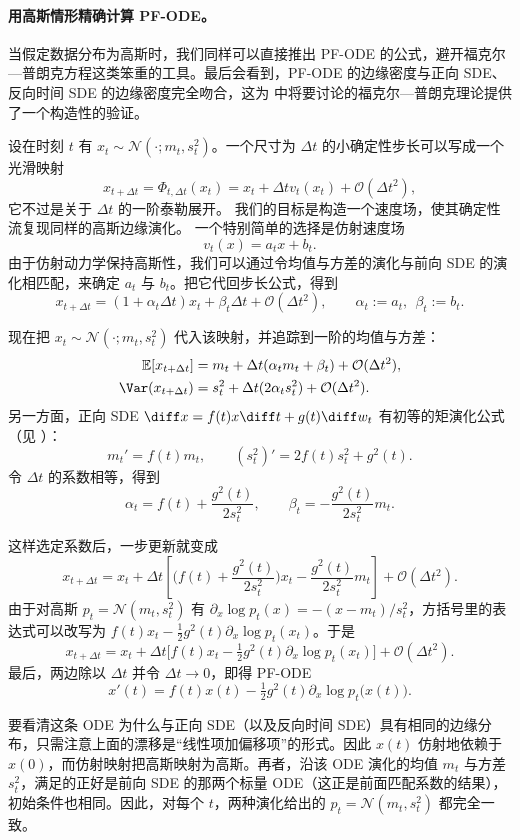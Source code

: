 \paragraph{用高斯情形精确计算 PF-ODE。}
当假定数据分布为高斯时，我们同样可以直接推出 PF-ODE 的公式，避开福克尔—普朗克方程这类笨重的工具。最后会看到，PF-ODE 的边缘密度与正向 SDE、反向时间 SDE 的边缘密度完全吻合，这为  中将要讨论的福克尔—普朗克理论提供了一个构造性的验证。


设在时刻 $t$ 有 $x_t\sim\mathcal N(\cdot;m_t,s_t^2)$。一个尺寸为 $\Delta t$ 的小确定性步长可以写成一个光滑映射
\[
x_{t+\Delta t}=\Phi_{t,\Delta t}(x_t)
= x_t + \Delta t v_t(x_t) + \mathcal{O}(\Delta t^2),
\]
它不过是关于 $\Delta t$ 的一阶泰勒展开。
我们的目标是构造一个速度场，使其确定性流复现同样的高斯边缘演化。
一个特别简单的选择是仿射速度场
\[
v_t(x)=a_t x+b_t.
\]
由于仿射动力学保持高斯性，我们可以通过令均值与方差的演化与前向 SDE 的演化相匹配，来确定 $a_t$ 与 $b_t$。把它代回步长公式，得到
\[
x_{t+\Delta t}=(1+\alpha_t \Delta t) x_t+\beta_t \Delta t+\mathcal{O}(\Delta t^2),
\qquad
\alpha_t:=a_t,\ \ \beta_t:=b_t.
\]


现在把 $x_t\sim\mathcal N(\cdot;m_t,s_t^2)$ 代入该映射，并追踪到一阶的均值与方差：
\begin{align*}
\mathbb E[x_{t+\Delta t}]
&= m_t+\Delta t(\alpha_t m_t+\beta_t)+\mathcal{O}(\Delta t^2),
\\
\Var(x_{t+\Delta t})
&= s_t^2+\Delta t (2\alpha_t s_t^2)+\mathcal{O}(\Delta t^2).
\end{align*}
另一方面，正向 SDE $\diff x=f(t) x \diff t+g(t) \diff w_t$ 有初等的矩演化公式（见 ）：
\[
m_t' = f(t) m_t,
\qquad
(s_t^2)' = 2 f(t) s_t^2 + g^2(t).
\]
令 $\Delta t$ 的系数相等，得到
\[
\alpha_t = f(t)+\frac{g^2(t)}{2 s_t^2},
\qquad
\beta_t = - \frac{g^2(t)}{2 s_t^2} m_t.
\]

这样选定系数后，一步更新就变成
\[
x_{t+\Delta t}
= x_t + \Delta t\!\left[\Big(f(t)+\frac{g^2(t)}{2s_t^2}\Big)x_t
-\frac{g^2(t)}{2s_t^2} m_t\right]+\mathcal{O}(\Delta t^2).
\]
由于对高斯 $p_t=\mathcal N(m_t,s_t^2)$ 有 $\partial_x\log p_t(x)=-(x-m_t)/s_t^2$，方括号里的表达式可以改写为 $f(t) x_t - \tfrac12 g^2(t) \partial_x\log p_t(x_t)$。于是
\[
x_{t+\Delta t}
= x_t + \Delta t\Big[f(t) x_t - \tfrac12 g^2(t) \partial_x\log p_t(x_t)\Big] + \mathcal{O}(\Delta t^2).
\]
最后，两边除以 $\Delta t$ 并令 $\Delta t\to 0$，即得 PF-ODE
\[
x'(t)  =  f(t) x(t)  -  \tfrac12 g^2(t) \partial_x\log p_t\!\big(x(t)\big).
\]

要看清这条 ODE 为什么与正向 SDE（以及反向时间 SDE）具有相同的边缘分布，只需注意上面的漂移是“线性项加偏移项”的形式。因此 $x(t)$ 仿射地依赖于 $x(0)$，而仿射映射把高斯映射为高斯。再者，沿该 ODE 演化的均值 $m_t$ 与方差 $s_t^2$，满足的正好是前向 SDE 的那两个标量 ODE（这正是前面匹配系数的结果），初始条件也相同。因此，对每个 $t$，两种演化给出的 $p_t=\mathcal N(m_t,s_t^2)$ 都完全一致。


